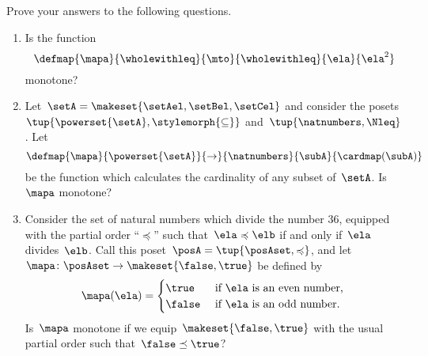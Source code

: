 \clearpage
\vfill
\begin{gradedexercise}
    \label{ex:MonotoneMapCheck}

    Prove your answers to the following questions.
    \begin{enumerate}
        \item Is the function
              \begin{equation*}
                  \defmap{\mapa}{\wholewithleq}{\mto}{\wholewithleq}{\ela}{\ela^2}
              \end{equation*}
              monotone?
        \item Let~$\setA = \makeset{\setAel, \setBel, \setCel}$ and consider the posets~$\tup{\powerset{\setA}, \stylemorph{\subseteq}}$ and~$\tup{\natnumbers, \Nleq}$.
              Let
              \begin{equation*}
                  \defmap{\mapa}{\powerset{\setA}}{\to}{\natnumbers}{\subA}{\cardmap(\subA)}
              \end{equation*}
              be the function which calculates the cardinality of any subset of~$\setA$.
              Is~$\mapa$ monotone?
        \item Consider the set of natural numbers which divide the number 36, equipped with the partial order ``$\preccurlyeq$'' such that~$\ela \preccurlyeq \elb$ if and only if~$\ela$ divides~$\elb$.
              Call this poset~$\posA = \tup{\posAset, \preccurlyeq}$, and let~$\mapa \colon \posAset \to \makeset{\false, \true}$ be defined by
              \begin{equation}
                  \mapa(\ela) =
                  \begin{cases}
                      \true  & \text{ if } \ela \text{ is an even number, } \\
                      \false & \text{ if } \ela \text{ is an odd number.
                      }
                  \end{cases}
              \end{equation}
              Is~$\mapa$ monotone if we equip~$\makeset{\false, \true}$ with the usual partial order such that~$\false \preceq \true$?
    \end{enumerate}
\end{gradedexercise}

